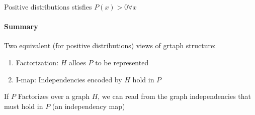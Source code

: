 Positive distributions stisfies $P(x)>0 \forall x$

\paragraph{Summary} Two equivalent (for positive distributions) views of grtaph structure:
\begin{enumerate}
 \item Factorization: $H$ alloes $P$ to be represented
 \item I-map: Independencies encoded by $H$ hold in $P$
\end{enumerate}

\begin{framed}
 \centering
 If $P$ Factorizes over a graph $H$, we can read from the graph independencies that must hold in $P$ (an independency map)
\end{framed}









